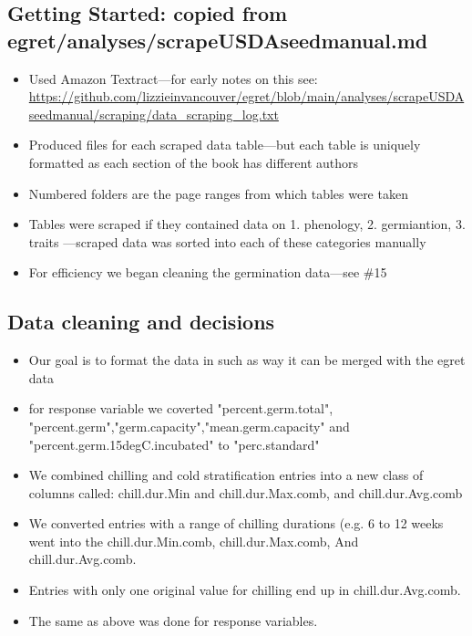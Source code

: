 \documentclass{article}[12pt]
\begin{document}
\subsection*{Getting Started: copied from egret/analyses/scrapeUSDAseedmanual.md}
\begin{itemize}
\item Used Amazon Textract---for early notes on this see: \url{https://github.com/lizzieinvancouver/egret/blob/main/analyses/scrapeUSDAseedmanual/scraping/data_scraping_log.txt}
\item Produced files for each scraped data table---but each table is uniquely formatted as each section of the book has different authors
\item Numbered folders are the page ranges from which tables were taken
\item Tables were scraped if they contained data on 1. phenology, 2. germiantion, 3. traits ---scraped data was sorted into each of these categories manually
\item For efficiency we began cleaning the germination data---see \#15
\end{itemize}

\subsection*{Data cleaning and decisions}
\begin{itemize}
\item Our goal is to format the data in such as way it can be merged with the egret data
\item for response variable we coverted  "percent.germ.total", "percent.germ","germ.capacity","mean.germ.capacity" and "percent.germ.15degC.incubated" to "perc.standard"
\item We combined chilling and cold stratification entries into a new class of columns called: chill.dur.Min and chill.dur.Max.comb, and chill.dur.Avg.comb
\item We converted entries with a range of chilling durations (e.g. 6 to 12 weeks went into the chill.dur.Min.comb, chill.dur.Max.comb, And chill.dur.Avg.comb. 
\item Entries with only one original value for chilling end up in chill.dur.Avg.comb. 
\item The same as above was done for response variables.
\end{itemize}
\end{document}
